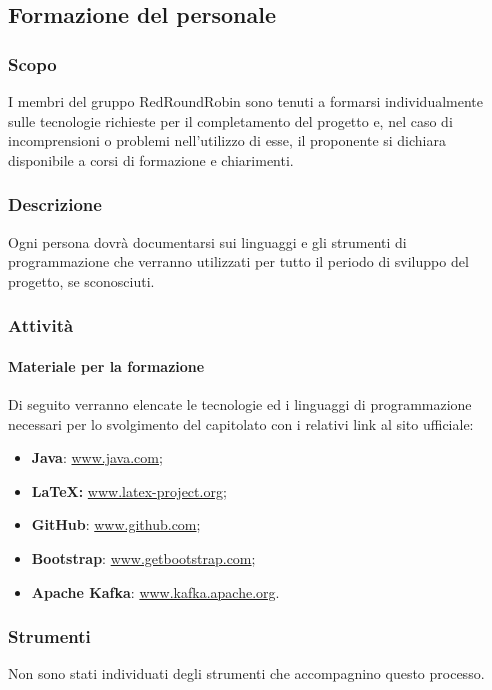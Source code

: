 \subsection{Formazione del personale}

	\subsubsection{Scopo}
		I membri del gruppo RedRoundRobin sono tenuti a formarsi individualmente sulle tecnologie richieste per il completamento del progetto e, nel caso di incomprensioni o problemi nell'utilizzo di esse, il proponente si dichiara disponibile a corsi di formazione e chiarimenti.
		
	\subsubsection{Descrizione}
		Ogni persona dovrà documentarsi sui linguaggi e gli strumenti di programmazione che verranno utilizzati per tutto il periodo di sviluppo del progetto, se sconosciuti.
	\subsubsection{Attività}

		\paragraph{Materiale per la formazione}
		Di seguito verranno elencate le tecnologie ed i linguaggi di programmazione necessari per lo svolgimento del capitolato con i relativi link al sito ufficiale:
		\begin{itemize}
			\item \textbf{Java}: \href{https://www.java.com/}{www.java.com};
			\item \textbf{\LaTeX{}:} \href{www.latex-project.org}{www.latex-project.org};
			\item \textbf{GitHub}: \href{www.github.com}{www.github.com};
			\item \textbf{Bootstrap}: \href{https://getbootstrap.com/}{www.getbootstrap.com};
			\item \textbf{Apache Kafka}: \href{https://kafka.apache.org/}{www.kafka.apache.org}.
		\end{itemize}

	\subsubsection{Strumenti}
		Non sono stati individuati degli strumenti che accompagnino questo processo.
